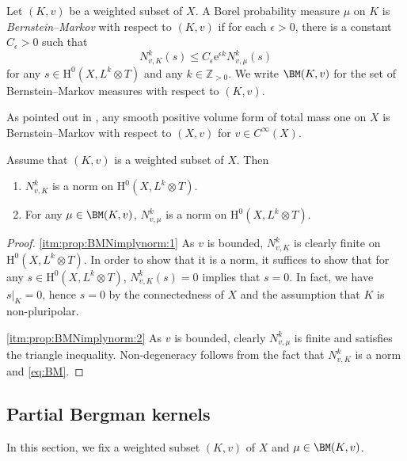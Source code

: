 \begin{definition}\label{def:BMmeasure}
Let $(K,v)$ be a weighted subset of $X$.
A Borel probability measure $\mu$ on $K$ is \emph{Bernstein--Markov} with respect to $(K,v)$ if for each $\epsilon>0$, there is a constant $C_\epsilon>0$ such that
\begin{equation}\label{eq:BM}
     N^k_{v,K}(s) \leq C_\epsilon \mathrm{e}^{\epsilon k} N^k_{v,\mu}(s)
\end{equation}
for any $s \in \mathrm{H}^0(X,L^k \otimes T)$ and any $k\in \mathbb{Z}_{>0}$.
We write $\BM(K,v)$ for the set of Bernstein--Markov measures with respect to $(K,v)$.
\end{definition}
As pointed out in \cite{BBWN11}, any smooth positive volume form of total mass one on $X$ is Bernstein--Markov with respect to $(X,v)$ for $v\in C^\infty(X)$.


\begin{proposition}\label{prop:BMNimplynorm}
Assume that $(K,v)$ is a weighted subset of $X$. Then
\begin{enumerate}
    \item\label{itm:prop:BMNimplynorm:1} $N^k_{v,K}$ is a norm on $\mathrm{H}^0(X,L^k\otimes T)$.
    \item\label{itm:prop:BMNimplynorm:2} For any $\mu\in \BM(K,v)$, $N^k_{v,\mu}$ is a norm on $\mathrm{H}^0(X,L^k\otimes T)$.
\end{enumerate}
\end{proposition}
\begin{proof}
\ref{itm:prop:BMNimplynorm:1}
As $v$ is bounded, $N^k_{v,K}$ is clearly finite on $\mathrm{H}^0(X,L^k\otimes T)$. In order to show that it is a norm, it suffices to show that for any $s\in \mathrm{H}^0(X,L^k\otimes T)$, $N^k_{v,K}(s)=0$ implies that $s=0$. In fact, we have $s|_K=0$, hence $s=0$ by the connectedness of $X$ and the assumption that $K$ is non-pluripolar.

\ref{itm:prop:BMNimplynorm:2}
As $v$ is bounded, clearly $N^k_{v,\mu}$ is finite and satisfies the triangle inequality. Non-degeneracy follows from the fact that $N^k_{v,K}$ is a norm and \eqref{eq:BM}.
\end{proof}



\subsection{Partial Bergman kernels}
\label{subsec:pBerg}
In this section, we fix a weighted subset $(K,v)$ of $X$ and $\mu\in \BM(K,v)$.

